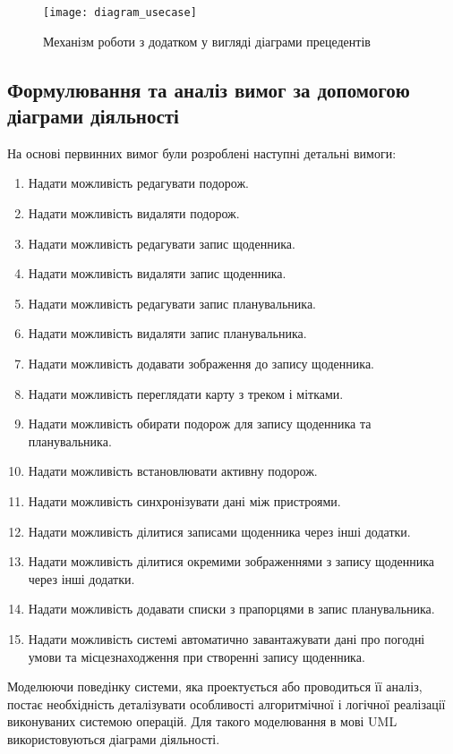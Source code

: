 \documentclass[../main.tex]{subfiles}
\begin{document}
\begin{figure}[H]
	\centering
	\texttt{[image: diagram\_usecase]}
	\caption{Механізм роботи з додатком у вигляді діаграми прецедентів}
	\label{diagram:2.1}
\end{figure}

\subsection{Формулювання та аналіз вимог за допомогою діаграми діяльності}
На основі первинних вимог були розроблені наступні детальні вимоги:
\begin{enumerate}
	\item Надати можливість редагувати подорож.
	\item Надати можливість видаляти подорож.
	\item Надати можливість редагувати запис щоденника.
	\item Надати можливість видаляти запис щоденника.
	\item Надати можливість редагувати запис планувальника.
	\item Надати можливість видаляти запис планувальника.
	\item Надати можливість додавати зображення до запису щоденника.
	\item Надати можливість переглядати карту з треком і мітками.
	\item Надати можливість обирати подорож для запису щоденника та планувальника.
	\item Надати можливість встановлювати активну подорож.
	\item Надати можливість синхронізувати дані між пристроями.
	\item Надати можливість ділитися записами щоденника через інші додатки.
	\item Надати можливість ділитися окремими зображеннями з запису щоденника через інші додатки.
	\item Надати можливість додавати списки з прапорцями в запис планувальника.
	\item Надати можливість системі автоматично завантажувати дані про погодні умови та місцезнаходження при створенні запису щоденника.
\end{enumerate}

Моделюючи поведінку системи, яка проектується або проводиться її аналіз, постає необхідність деталізувати особливості алгоритмічної і логічної реалізації виконуваних системою операцій. Для такого моделювання в мові UML використовуються діаграми діяльності.
\end{document}
